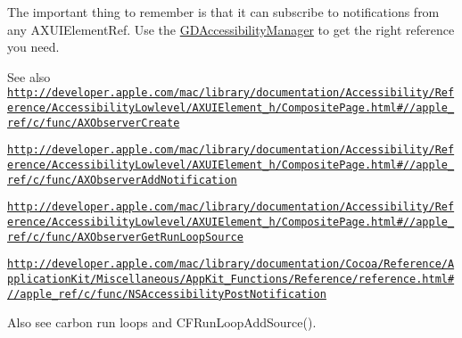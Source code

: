 The important thing to remember is that it can subscribe to notifications from any AXUIElementRef. Use the \hyperlink{interface_g_d_accessibility_manager}{GDAccessibilityManager} to get the right reference you need.

\begin{DoxySeeAlso}{See also}
\href{http://developer.apple.com/mac/library/documentation/Accessibility/Reference/AccessibilityLowlevel/AXUIElement_h/CompositePage.html#//apple_ref/c/func/AXObserverCreate}{\tt http://developer.apple.com/mac/library/documentation/Accessibility/Reference/AccessibilityLowlevel/AXUIElement\_\-h/CompositePage.html\#//apple\_\-ref/c/func/AXObserverCreate} 

\href{http://developer.apple.com/mac/library/documentation/Accessibility/Reference/AccessibilityLowlevel/AXUIElement_h/CompositePage.html#//apple_ref/c/func/AXObserverAddNotification}{\tt http://developer.apple.com/mac/library/documentation/Accessibility/Reference/AccessibilityLowlevel/AXUIElement\_\-h/CompositePage.html\#//apple\_\-ref/c/func/AXObserverAddNotification} 

\href{http://developer.apple.com/mac/library/documentation/Accessibility/Reference/AccessibilityLowlevel/AXUIElement_h/CompositePage.html#//apple_ref/c/func/AXObserverGetRunLoopSource}{\tt http://developer.apple.com/mac/library/documentation/Accessibility/Reference/AccessibilityLowlevel/AXUIElement\_\-h/CompositePage.html\#//apple\_\-ref/c/func/AXObserverGetRunLoopSource} 

\href{http://developer.apple.com/mac/library/documentation/Cocoa/Reference/ApplicationKit/Miscellaneous/AppKit_Functions/Reference/reference.html#//apple_ref/c/func/NSAccessibilityPostNotification}{\tt http://developer.apple.com/mac/library/documentation/Cocoa/Reference/ApplicationKit/Miscellaneous/AppKit\_\-Functions/Reference/reference.html\#//apple\_\-ref/c/func/NSAccessibilityPostNotification} 

Also see carbon run loops and CFRunLoopAddSource(). 
\end{DoxySeeAlso}


